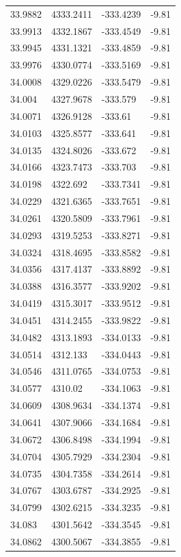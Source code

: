 \begin{table}[H]
\begin{tabular}{llll}
33.9882 & 4333.2411 & -333.4239 & -9.81 \\
33.9913 & 4332.1867 & -333.4549 & -9.81 \\
33.9945 & 4331.1321 & -333.4859 & -9.81 \\
33.9976 & 4330.0774 & -333.5169 & -9.81 \\
34.0008 & 4329.0226 & -333.5479 & -9.81 \\
34.004 & 4327.9678 & -333.579 & -9.81 \\
34.0071 & 4326.9128 & -333.61 & -9.81 \\
34.0103 & 4325.8577 & -333.641 & -9.81 \\
34.0135 & 4324.8026 & -333.672 & -9.81 \\
34.0166 & 4323.7473 & -333.703 & -9.81 \\
34.0198 & 4322.692 & -333.7341 & -9.81 \\
34.0229 & 4321.6365 & -333.7651 & -9.81 \\
34.0261 & 4320.5809 & -333.7961 & -9.81 \\
34.0293 & 4319.5253 & -333.8271 & -9.81 \\
34.0324 & 4318.4695 & -333.8582 & -9.81 \\
34.0356 & 4317.4137 & -333.8892 & -9.81 \\
34.0388 & 4316.3577 & -333.9202 & -9.81 \\
34.0419 & 4315.3017 & -333.9512 & -9.81 \\
34.0451 & 4314.2455 & -333.9822 & -9.81 \\
34.0482 & 4313.1893 & -334.0133 & -9.81 \\
34.0514 & 4312.133 & -334.0443 & -9.81 \\
34.0546 & 4311.0765 & -334.0753 & -9.81 \\
34.0577 & 4310.02 & -334.1063 & -9.81 \\
34.0609 & 4308.9634 & -334.1374 & -9.81 \\
34.0641 & 4307.9066 & -334.1684 & -9.81 \\
34.0672 & 4306.8498 & -334.1994 & -9.81 \\
34.0704 & 4305.7929 & -334.2304 & -9.81 \\
34.0735 & 4304.7358 & -334.2614 & -9.81 \\
34.0767 & 4303.6787 & -334.2925 & -9.81 \\
34.0799 & 4302.6215 & -334.3235 & -9.81 \\
34.083 & 4301.5642 & -334.3545 & -9.81 \\
34.0862 & 4300.5067 & -334.3855 & -9.81 \\

\end{tabular}
\end{table}
